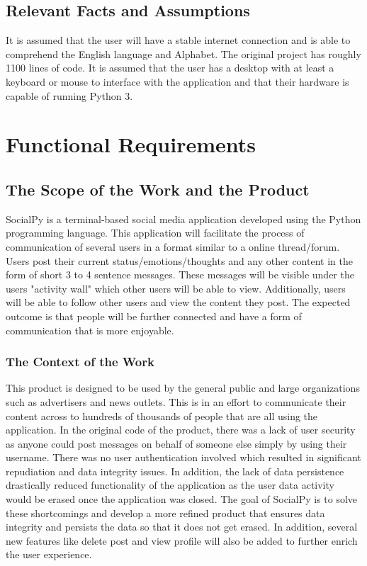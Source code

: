 \documentclass[12pt, titlepage]{article}
\begin{document}
\subsection{Relevant Facts and Assumptions}
It is assumed that the user will have a stable internet connection and is able to comprehend the English language and Alphabet. The original project has roughly 1100 lines of code. It is assumed that the user has a desktop with at least a keyboard or mouse to interface with the application and that their hardware is capable of running Python 3.

\section{Functional Requirements}

\subsection{The Scope of the Work and the Product}
SocialPy is a terminal-based social media application developed using the Python programming language. This application will facilitate the process of communication of several users in a format similar to a online thread/forum. Users post their current status/emotions/thoughts and any other content in the form of short 3 to 4 sentence messages. These messages will be visible under the users "activity wall" which other users will be able to view. Additionally, users will be able to follow other users and view the content they post. The expected outcome is that people will be further connected and have a form of communication that is more enjoyable.

\subsubsection{The Context of the Work}
This product is designed to be used by the general public and large organizations such as advertisers and news outlets. This is in an effort to communicate their content across to hundreds of thousands of people that are all using the application.
In the original code of the product, there was a lack of user security as anyone could post messages on behalf of someone else simply by using their username. There was no user authentication involved which resulted in significant repudiation and data integrity issues. In addition, the lack of data persistence drastically reduced functionality of the application as the user data activity would be erased once the application was closed. The goal of SocialPy is to solve these shortcomings and develop a more refined product that ensures data integrity and persists the data so that it does not get erased. In addition, several new features like delete post and view profile will also be added to further enrich the user experience.
\end{document}
